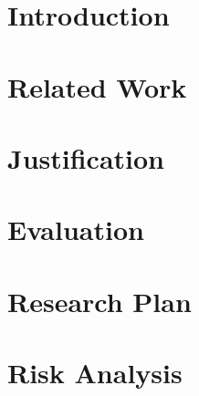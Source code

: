 
\section{Introduction} %


\section{Related Work} %

\section{Justification} %

\section{Evaluation} %

\section{Research Plan} %

\section{Risk Analysis} %
\label{sec:sim}




